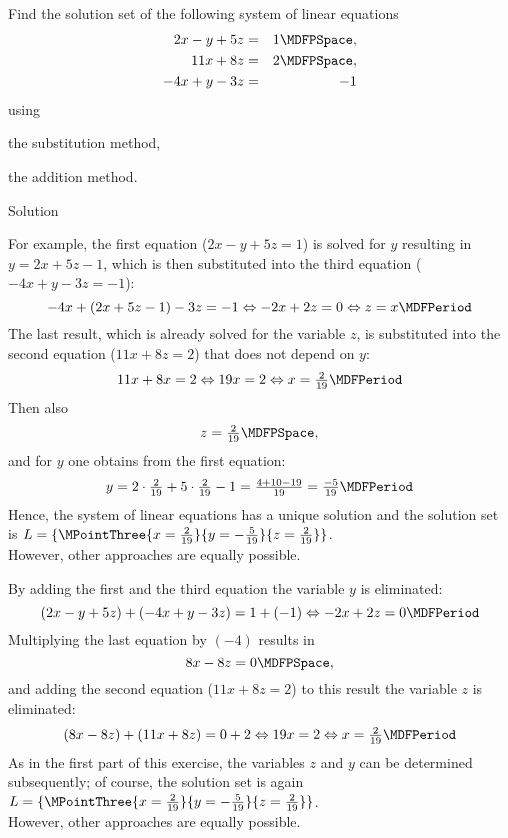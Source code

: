 \begin{MExercises}
\begin{MExercise}
Find the solution set of the following system of linear equations
\begin{eqnarray*}
2 x - y + 5 z & = & 1 \MDFPSpace, \\ 11 x + 8 z & = & 2 \MDFPSpace, \\ - 4 x + y - 3 z & = & - 1
\end{eqnarray*}
using 
\begin{MExerciseItems}
\item{the substitution method,}
\item{the addition method.}
\end{MExerciseItems}

\begin{MHint}{Solution}
\begin{MExerciseItems}
\item{For example, the first equation ($2 x - y + 5 z = 1$) is solved for $y$ resulting
in $y = 2 x + 5 z - 1$, which is then substituted into the third equation ($- 4 x + y - 3 z = - 1$):
$$- 4 x + (2 x + 5 z - 1) - 3 z = - 1 \Leftrightarrow - 2 x + 2 z = 0 \Leftrightarrow z = x \MDFPeriod$$
The last result, which is already solved for the variable $z$, is substituted into the second
equation ($11 x + 8 z = 2$) that does not depend on $y$:
$$11 x + 8 x = 2 \Leftrightarrow 19 x = 2 \Leftrightarrow x = \Mtfrac{2}{19} \MDFPeriod$$
Then also
$$z = \Mtfrac{2}{19} \MDFPSpace ,$$
and for $y$ one obtains from the first equation:
$$y = 2 \cdot \Mtfrac{2}{19} + 5 \cdot \Mtfrac{2}{19} - 1 = \Mtfrac{4 + 10 - 19}{19} = \Mtfrac{-5}{19} \MDFPeriod$$
Hence, the system of linear equations has a unique solution and the solution set is
 ${\ML} = \{ \MPointThree{x = \Mtfrac{2}{19}}{
y = - \Mtfrac{5}{19}}{ z = \Mtfrac{2}{19}} \}$.\\
However, other approaches are equally possible.}
\item{By adding the first and the third equation the variable $y$ is eliminated:
$$(2 x - y + 5 z) + (- 4 x + y - 3 z) = 1 + (- 1) \Leftrightarrow - 2 x + 2 z = 0 \MDFPeriod$$
Multiplying the last equation by $(- 4)$ results in
$$8 x - 8 z = 0 \MDFPSpace ,$$
and adding the second equation ($11 x  + 8 z = 2$) to this result the variable $z$ is eliminated:
$$(8 x - 8 z) + (11 x + 8 z) = 0 + 2 \Leftrightarrow 19 x = 2 \Leftrightarrow x = \Mtfrac{2}{19} \MDFPeriod$$
As in the first part of this exercise, the variables $z$ and $y$ can be determined subsequently; 
of course, the solution set is again ${\ML} = \{ \MPointThree{x = \Mtfrac{2}{19}}{y = - \Mtfrac{5}{19}}{z = \Mtfrac{2}{19}} \}$.\\
However, other approaches are equally possible.}
\end{MExerciseItems}
\end{MHint}
\end{MExercise}


\end{MExercises}
